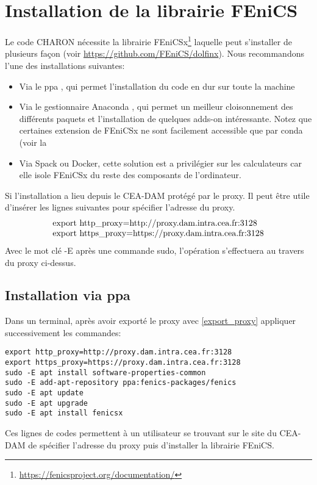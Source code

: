 \documentclass[10pt]{book}
\begin{document}
\section{Installation de la librairie FEniCS}\label{Section:Installation de la librairie FEniCS CHARON}
Le code CHARON nécessite la librairie FEniCSx\footnote{\url{https://fenicsproject.org/documentation/}} laquelle peut s'installer de plusieurs façon (voir \url{https://github.com/FEniCS/dolfinx}). Nous recommandons l'une des installations suivantes:
\begin{itemize}
\item Via le ppa , qui permet l'installation du code \og en dur \fg{} sur toute la machine 
\item Via le gestionnaire Anaconda , qui permet un meilleur cloisonnement des différents paquets et l'installation de quelques adds-on intéressante. Notez que certaines extension de FEniCSx ne sont facilement accessible que par conda (voir la 
\item Via Spack ou Docker, cette solution est a privilégier sur les calculateurs car elle isole FEniCSx du reste des composants de l'ordinateur.
\end{itemize}
Si l'installation a lieu depuis le CEA-DAM protégé par le proxy. Il peut être utile d'insérer les lignes suivantes pour spécifier l'adresse du proxy.
\begin{equation}
\begin{tabular}{l}
\text{export http\_proxy=http://proxy.dam.intra.cea.fr:3128}\\
\text{export https\_proxy=https://proxy.dam.intra.cea.fr:3128}
\end{tabular}
\label{export_proxy}
\end{equation}
Avec le mot clé -E après une commande sudo, l'opération s'effectuera au travers du proxy ci-dessus.
\subsection{Installation via ppa}\label{Subsection:ppa}
Dans un terminal, après avoir exporté le proxy avec \eqref{export_proxy} appliquer successivement les commandes:
\begin{verbatim}
export http_proxy=http://proxy.dam.intra.cea.fr:3128
export https_proxy=https://proxy.dam.intra.cea.fr:3128
sudo -E apt install software-properties-common
sudo -E add-apt-repository ppa:fenics-packages/fenics
sudo -E apt update
sudo -E apt upgrade
sudo -E apt install fenicsx
\end{verbatim}
Ces lignes de codes permettent à un utilisateur se trouvant sur le site du CEA-DAM de spécifier l'adresse du proxy puis d'installer la librairie FEniCS.\\
\end{document}
